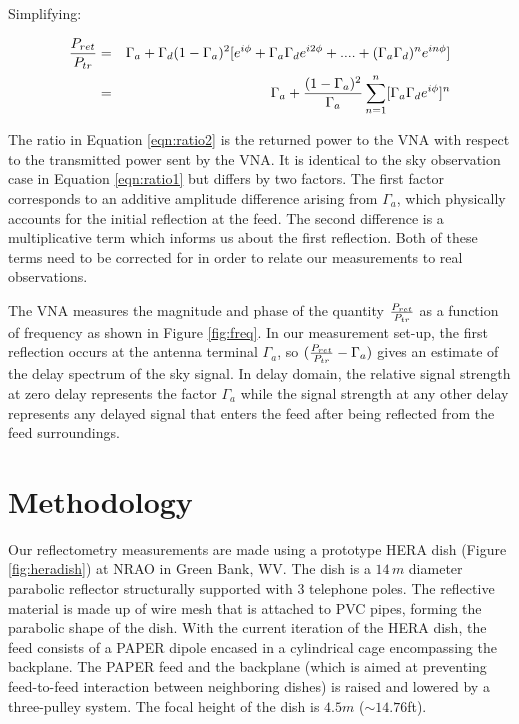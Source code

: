 \documentclass[12pt,preprint]{aastex}
\begin{document}
Simplifying:
 
  \begin{eqnarray}\label{eqn:ratio2}
 {P_{ret} \over P_{tr} } & = & \Gamma_{a}
  +  \Gamma_{d}(1-\Gamma_a)^{2} [e^{i\phi}+ \Gamma_{a}\Gamma_{d} e^{i2\phi}+  ....+ (\Gamma_{a}\Gamma_{d})^{n}e^{i n\phi}]\nonumber\\
  & = & \Gamma_{a} + { (1-\Gamma_a)^{2}\over \Gamma_{a} } \displaystyle\sum\limits_{n=1}^{n} [\Gamma_{a}\Gamma_{d}e^{i\phi}]^{n}
   \nonumber\\
\end{eqnarray}

The ratio in Equation \ref{eqn:ratio2} is the returned power to the VNA with
respect to the transmitted power sent by the VNA. It is identical to the sky
observation case in Equation \ref{eqn:ratio1} but differs by two factors. The
first factor corresponds to an additive amplitude difference arising from
$\Gamma_{a}$, which physically accounts for the initial reflection at the feed.
The second difference is a multiplicative term which informs us about the first
reflection. Both of these terms need to be corrected for in order to relate our
measurements to real observations.

The VNA measures the magnitude and phase of the quantity ${P_{ret}\over P_{tr}}$
as a function of frequency as shown in Figure \ref{fig:freq}. In our measurement
set-up, the first reflection occurs at the antenna terminal $\Gamma_{a}$, so
$({P_{ret} \over P_{tr} }  - \Gamma_{a}) $ gives an estimate of the delay
spectrum of the sky signal. In delay domain, the relative signal strength at
zero delay represents the factor $\Gamma_{a}$ while the signal strength at any
other delay represents any delayed signal that enters the feed after being
reflected from the feed surroundings. 

\section{Methodology}{\label{sec:methods}}

Our reflectometry measurements are made using a prototype HERA dish (Figure
\ref{fig:heradish}) at NRAO in Green Bank, WV. The dish is a $14\,m$ diameter
parabolic reflector structurally supported with 3 telephone poles. The
reflective material is made up of wire mesh that is attached to PVC
pipes, forming the parabolic shape of the dish. With the current iteration of
the HERA dish, the feed consists of a PAPER dipole encased in a cylindrical cage
encompassing the backplane. The PAPER feed and the backplane (which is aimed at
preventing feed-to-feed interaction between neighboring dishes) is raised and
lowered by a three-pulley system. The focal height of the dish is $4.5m$
($\sim{14.76}$ft).  
\end{document}
